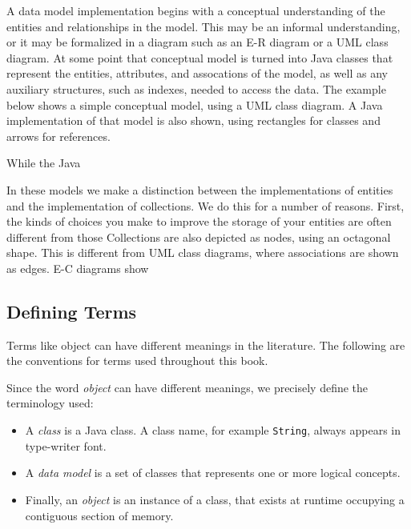 A data model implementation begins with a conceptual understanding of the entities and relationships in the model.  This may be an informal understanding, or it may be formalized in a diagram such as an E-R diagram or a UML class diagram.  At some point that conceptual model is turned into Java classes that represent the entities, attributes, and assocations of the model, as well as any auxiliary structures, such as indexes, needed to access the data.  The example below shows a simple conceptual model, using a UML class diagram.  A Java implementation of that model is also shown, using rectangles for classes and arrows for references.  %

While the Java 


In these models we make a distinction between the implementations of entities and the implementation of collections.  We do this for a number of reasons.  First, the kinds of choices you make to improve the storage of your entities are often different from those Collections are also depicted as nodes, using an octagonal shape.  This is different from UML class diagrams, where associations are shown as edges. E-C diagrams show 

\subsection{Defining Terms}

Terms like object can have different meanings in the literature.  The following are the conventions for terms used throughout this book.

Since the word \textit{object} can have different meanings, we precisely define the terminology used:
\begin{itemize}
\item A \textit{class} is a Java class. A class name, for example \texttt{String}, always appears in type-writer font. 
\item A \textit{data model} is a set of classes that represents one or more logical concepts.
\item Finally, an \textit{object} is an instance of a class, that exists at runtime occupying a contiguous section of memory.
\end{itemize} 







 

